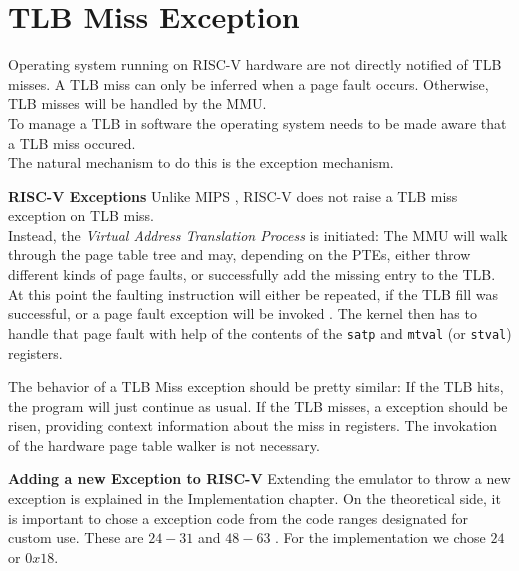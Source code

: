 \section{TLB Miss Exception}
Operating system running on RISC-V hardware are not directly notified of TLB misses.
A TLB miss can only be inferred when a page fault occurs. Otherwise, TLB misses will be handled
by the MMU.\\
To manage a TLB in software the operating system needs to be made aware that a TLB miss occured.\\
The natural mechanism to do this is the exception mechanism.

\textbf{RISC-V Exceptions}
Unlike MIPS \cite{heiserAnatomyHighPerformanceMicrokernel}, RISC-V does not raise a TLB miss exception on TLB miss.\\
Instead, the \emph{Virtual Address Translation Process} is initiated: The MMU will walk through
the page table tree and may, depending on the PTEs, either throw different kinds of page faults, or
successfully add the missing entry to the TLB.\\
At this point the faulting instruction will either be repeated, if the TLB fill was successful, or
a page fault exception will be invoked \cite{RISCVInstructionSet}. The kernel then has to handle that page fault with help
of the contents of the \texttt{satp} and \texttt{mtval} (or \texttt{stval}) registers.

The behavior of a TLB Miss exception should be pretty similar: If the TLB hits, the program will
just continue as usual. If the TLB misses, a exception should be risen, providing context
information about the miss in registers. The invokation of the hardware page table walker is
not necessary.


\textbf{Adding a new Exception to RISC-V}
Extending the emulator to throw a new exception is explained in the Implementation chapter.
On the theoretical side, it is important to chose a exception code from the code ranges designated
for custom use. These are $24-31$ and $48-63$ \cite{RISCVInstructionSet}. For the implementation we chose $24$ or $0x18$.



